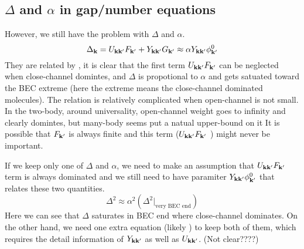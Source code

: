 \subsection{$\Delta$ and $\alpha$ in gap/number equations}
However, we still have the problem with $\Delta$ and $\alpha$.  
\begin{equation}\label{eq:20101011:delta}
\Delta_{\mathbf{k}}=U_{\mathbf{k}\mathbf{k}'}F_{\mathbf{k}'}+Y_{\mathbf{k}\mathbf{k}'}G_{\mathbf{k}'}\approx\alpha{Y_{\ensuremath{\mathbf{k}}\ensuremath{\mathbf{k}}'}\phi^{0}_{\ensuremath{\mathbf{k}}'}}
\end{equation}
They are related by , it is clear that the first term $U_{\mathbf{k}\mathbf{k}'}F_{\mathbf{k}'}$ can be neglected when close-channel domintes, and $\Delta$ is propotional to $\alpha$ and gets satuated toward the BEC extreme (here the extreme means the close-channel dominated molecules).  The relation is relatively complicated when open-channel is not small. In the two-body, around universality, open-channel weight goes to infinity and clearly domintes, but many-body seems put a natual upper-bound on it  It is possible that $F_{\mathbf{k}'}$ is always finite and  this term ($U_{\mathbf{k}\mathbf{k}'}F_{\mathbf{k}'}$ ) might never be important.  

If we keep only one of $\Delta$ and $\alpha$, we need to make an assumption that $U_{\mathbf{k}\mathbf{k}'}F_{\mathbf{k}'}$ term is always dominated and we still need to have paramiter $Y_{\mathbf{k}\mathbf{k}'}\phi^{0}_{\mathbf{k}'}$ that relates these two quantities. 
\[\Delta^{2}\approx\alpha^{2}(\Delta^{2}|_{\text{very BEC end}})
\]
Here we can see that $\Delta$ saturates in BEC end where close-channel dominates.   On the other hand, we need one extra equation (likely ) to keep both of them, which requires the detail information of $Y_{\mathbf{k}\mathbf{k}'}$ as well as $U_{\mathbf{k}\mathbf{k}'}$.  (Not clear????)